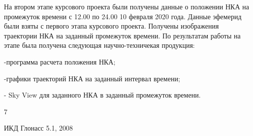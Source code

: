 \documentclass[]{article}
\begin{document}
На втором этапе курсового проекта были получены данные о положении НКА на промежуток времени с 12.00 по 24.00 10 февраля 2020 года. Данные эфемерид были взяты с первого этапа курсового проекта. Получены изображения траектории НКА на заданный промежуток времени. По результатам работы на этапе была получена следующая научно-техничекая продукция:

-программа расчета положения НКА;

-графики траекторий НКА на заданный интервал времени;

- Sky View для заданного НКА в заданный промежуток времени.


\newpage
{}
\begin{thebibliography} {7}
	
	 ИКД Глонасс 5.1, 2008
	

\end{thebibliography}
\end{document}
